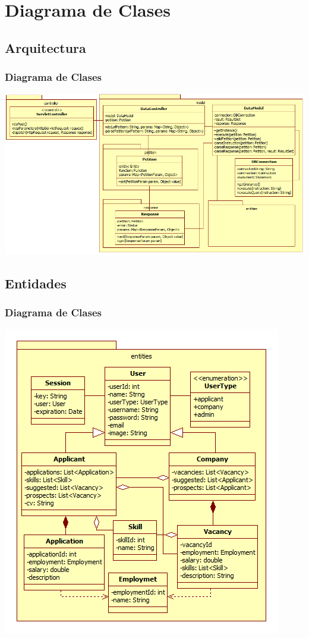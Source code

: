 \newpage
\section{Diagrama de Clases}
\subsection{Arquitectura}
\frame
{
  \frametitle{Diagrama de Clases}
  \begin{center}
		\includegraphics[scale=0.42]{./resources/ClassDiagramArchitecture.png}
  \end{center}
}
\subsection{Entidades}
\frame
{
  \frametitle{Diagrama de Clases}
  \begin{center}
		\includegraphics[scale=0.47]{./resources/ClassDiagramEntities.png}
  \end{center}
}

